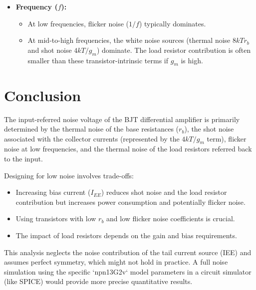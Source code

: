 \documentclass[11pt]{article}
\begin{document}
\begin{itemize}
    \item \textbf{Frequency ($f$):}
        \begin{itemize}
            \item At low frequencies, flicker noise ($1/f$) typically dominates.
            \item At mid-to-high frequencies, the white noise sources (thermal noise $8kT r_b$ and shot noise $4kT/g_m$) dominate. The load resistor contribution is often smaller than these transistor-intrinsic terms if $g_m$ is high.
        \end{itemize}
\end{itemize}

\section{Conclusion}

The input-referred noise voltage of the BJT differential amplifier is primarily determined by the thermal noise of the base resistances ($r_b$), the shot noise associated with the collector currents (represented by the $4kT/g_m$ term), flicker noise at low frequencies, and the thermal noise of the load resistors referred back to the input.

Designing for low noise involves trade-offs:
\begin{itemize}
    \item Increasing bias current ($I_{EE}$) reduces shot noise and the load resistor contribution but increases power consumption and potentially flicker noise.
    \item Using transistors with low $r_b$ and low flicker noise coefficients is crucial.
    \item The impact of load resistors depends on the gain and bias requirements.
\end{itemize}
This analysis neglects the noise contribution of the tail current source (IEE) and assumes perfect symmetry, which might not hold in practice. A full noise simulation using the specific `npn13G2v` model parameters in a circuit simulator (like SPICE) would provide more precise quantitative results.
\end{document}
